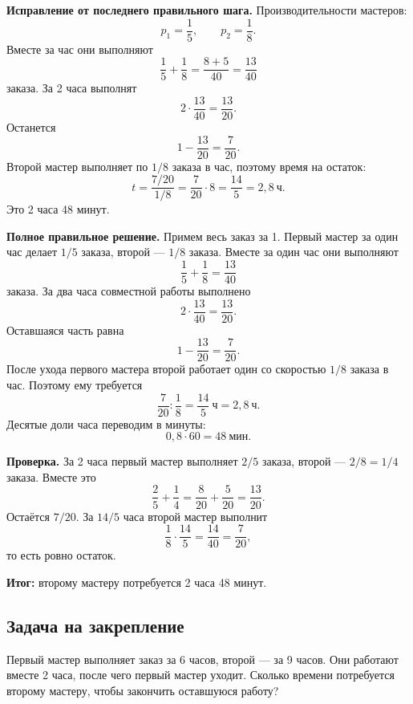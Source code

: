 \documentclass[12pt,a4paper]{article}
\newcommand{\finalresult}[1]{\textcolor{resultteal}{\textbf{Итог:}} #1}
\begin{document}
\textbf{Исправление от последнего правильного шага.} Производительности мастеров:
\[
p_1=\frac{1}{5},\qquad p_2=\frac{1}{8}.
\]
Вместе за час они выполняют
\[
\frac{1}{5}+\frac{1}{8}=\frac{8+5}{40}=\frac{13}{40}
\]
заказа. За 2 часа выполнят
\[
2\cdot\frac{13}{40}=\frac{13}{20}.
\]
Останется
\[
1-\frac{13}{20}=\frac{7}{20}.
\]
Второй мастер выполняет по $1/8$ заказа в час, поэтому время на остаток:
\[
t=\frac{7/20}{1/8}=\frac{7}{20}\cdot8=\frac{14}{5}=2{,}8\ \text{ч}.
\]
Это 2 часа 48 минут.

\textbf{Полное правильное решение.} Примем весь заказ за 1. Первый мастер за один час делает $1/5$ заказа, второй --- $1/8$ заказа. Вместе за один час они выполняют
\[
\frac{1}{5}+\frac{1}{8}=\frac{13}{40}
\]
заказа. За два часа совместной работы выполнено
\[
2\cdot\frac{13}{40}=\frac{13}{20}.
\]
Оставшаяся часть равна
\[
1-\frac{13}{20}=\frac{7}{20}.
\]
После ухода первого мастера второй работает один со скоростью $1/8$ заказа в час. Поэтому ему требуется
\[
\frac{7}{20}:\frac{1}{8}=\frac{14}{5}\ \text{ч}=2{,}8\ \text{ч}.
\]
Десятые доли часа переводим в минуты:
\[
0{,}8\cdot60=48\ \text{мин}.
\]

\textbf{Проверка.} За 2 часа первый мастер выполняет $2/5$ заказа, второй --- $2/8=1/4$ заказа. Вместе это
\[
\frac{2}{5}+\frac{1}{4}=\frac{8}{20}+\frac{5}{20}=\frac{13}{20}.
\]
Остаётся $7/20$. За $14/5$ часа второй мастер выполнит
\[
\frac{1}{8}\cdot\frac{14}{5}=\frac{14}{40}=\frac{7}{20},
\]
то есть ровно остаток.

\finalresult{второму мастеру потребуется 2 часа 48 минут.}

\subsection*{Задача на закрепление}
Первый мастер выполняет заказ за 6 часов, второй --- за 9 часов. Они работают вместе 2 часа, после чего первый мастер уходит. Сколько времени потребуется второму мастеру, чтобы закончить оставшуюся работу?
\end{document}
